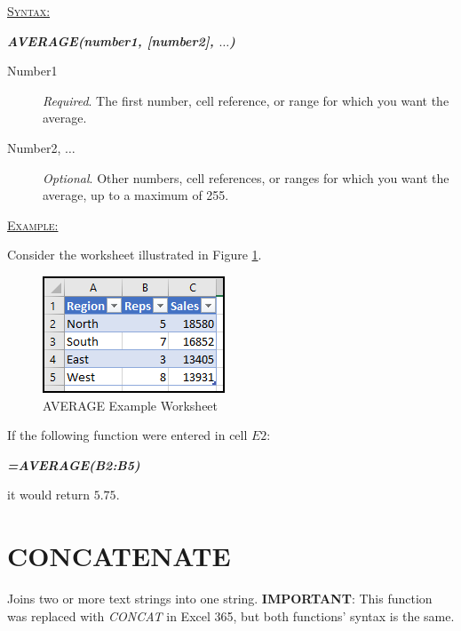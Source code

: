 \begin{addmargin}[1cm]{0cm}

	\medskip
	\underline{\textsc{Syntax:}}
	\medskip

	{\color{Syntax}
		\noindent\textbf{\textit{AVERAGE(number1, [number2], $\ldots$)}}
	}
	
	\begin{description}
		\item[Number1] \textit{Required}. The first number, cell reference, or range for which you want the average.
		\item[Number2, $\ldots$] \textit{Optional}. Other numbers, cell references, or ranges for which you want the average, up to a maximum of 255.
	\end{description}

	\medskip
	\noindent\underline{\textsc{Example:}}
	\medskip
	
	\noindent Consider the worksheet illustrated in Figure \ref{apa:avr}.

	\begin{figure}[H]
		\centering
		\includegraphics[width=\maxwidth{.45\linewidth}]{gfx/apa_fig01}
		\caption{AVERAGE Example Worksheet}
		\label{apa:avr}
	\end{figure}
	
	\noindent If the following function were entered in cell $ E2 $:
	
	{\color{Syntax}
		\textit{\textbf{=AVERAGE(B2:B5)}}
	}
	
	\noindent it would return $ 5.75 $.

\end{addmargin}

\section{CONCATENATE}

Joins two or more text strings into one string. \textbf{IMPORTANT}: This function was replaced with \textit{CONCAT} in Excel 365, but both functions' syntax is the same.


